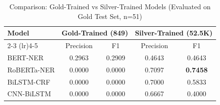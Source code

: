 
\begin{table}[htbp]
\centering
\caption{Comparison: Gold-Trained vs Silver-Trained Models (Evaluated on Gold Test Set, n=51)}
\label{tab:gold-vs-silver-training}
\begin{tabular}{lcccc}
\toprule
\textbf{Model} & \multicolumn{2}{c}{\textbf{Gold-Trained (849)}} & \multicolumn{2}{c}{\textbf{Silver-Trained (52.5K)}} \\
\cmidrule(lr){2-3} \cmidrule(lr){4-5}
& Precision & F1 & Precision & F1 \\
\midrule
BERT-NER & 0.2963 & 0.2909 & 0.4643 & 0.4643 \\
RoBERTa-NER & 0.0000 & 0.0000 & 0.7097 & \textbf{0.7458} \\
BiLSTM-CRF & 0.0000 & 0.0000 & 0.7000 & 0.5833 \\
CNN-BiLSTM & 0.0000 & 0.0000 & 0.6667 & 0.4000 \\
\bottomrule
\end{tabular}
\end{table}
